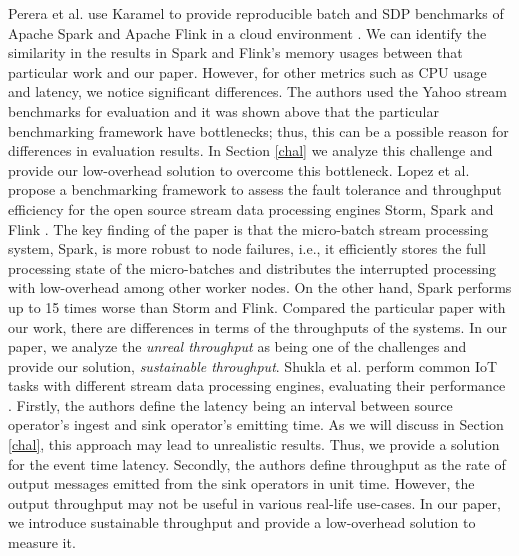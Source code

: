 Perera et al. use Karamel \cite{karamel} to provide reproducible batch and SDP benchmarks of Apache Spark and Apache Flink in a cloud environment \cite{perera2016reproducible}.  We can identify the similarity in the results in Spark and Flink's memory usages between that particular work and  our paper. However, for other metrics such as CPU usage and latency, we notice significant differences. The authors used the  Yahoo stream benchmarks for evaluation and  it was shown above that the particular benchmarking framework have bottlenecks; thus, this can be a possible reason for differences in evaluation results. In Section \ref{chal} we analyze this challenge and provide our low-overhead  solution to overcome this bottleneck.
Lopez et al. propose a benchmarking framework to assess the fault tolerance and throughput efficiency for the open source stream data processing engines Storm, Spark and Flink \cite{lopez2016performance}. The key finding of the paper is that  the micro-batch stream processing system, Spark, is more robust to node failures, i.e., it efficiently stores the full processing state of the micro-batches and distributes the interrupted processing with low-overhead among other worker nodes.
On the other hand, Spark performs up to 15 times worse than Storm and Flink. Compared the particular paper with our work,  there are differences in terms of the throughputs of the systems. In our paper, we analyze the \textit{unreal throughput} as being one of the challenges and provide our solution, \textit{sustainable throughput}.   
Shukla et al. perform common IoT tasks with different stream data processing engines, evaluating their performance \cite{shukla2016benchmarking}. 
Firstly, the authors define the latency being an interval  between source operator's ingest and sink operator's emitting time. As we will discuss in Section \ref{chal}, this approach may lead to unrealistic results. Thus, we provide a solution for the event time latency.  Secondly, the authors define throughput  as the  rate of output messages emitted from the sink operators in unit time. However, the output throughput may not be useful in various real-life use-cases. In our paper, we introduce sustainable throughput and provide a low-overhead solution to measure it. 

